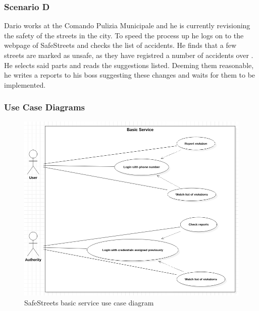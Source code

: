 \subsubsection*{Scenario D}

Dario works at the Comando Pulizia Municipale and he is currently revisioning the safety of the streets in the city. To speed the process up he logs on to the webpage of SafeStreets and checks the list of accidents. He finds that a few streets are marked as unsafe, as they have registred a number of accidents over \tres . He selects said parts and reads the suggestions listed. Deeming them reasonable, he writes a reports to his boss suggesting these changes and waits for them to be implemented.

\subsubsection{Use Case Diagrams}

\begin{figure}[H]
\includegraphics[scale=0.41]{Images/Diagrams/UseCase1.png}
\caption{\label{fig:UseCase1}SafeStreets basic service use case diagram}
\end{figure}

